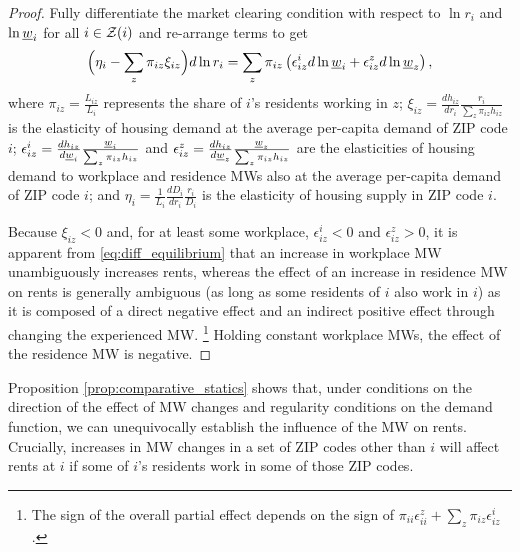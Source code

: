 \begin{proof}
    Fully differentiate the market clearing condition with respect to $\ln r_i$ and 
    $\ln \underline{w}_i$ for all $i\in\mathcal{Z}(i)$ and re-arrange terms to get
    \begin{equation}\label{eq:diff_equilibrium}
        \Big(\eta_i - \sum_z \pi_{iz} \xi_{iz} \Big) d \ln r_i
        = 
        \sum_z \pi_{iz} \left(\epsilon_{iz}^i d \ln \underline{w}_i 
                            + \epsilon_{iz}^z d \ln \underline{w}_z \right) ,
    \end{equation}
    where 
    $\pi_{iz} = \frac{L_{iz}}{L_i}$ represents the share of $i$'s residents working 
    in $z$;
    $\xi_{iz} = \frac{d h_{iz}}{d r_i} \frac{r_i}{\sum_z \pi_{iz} h_{iz}}$ is the 
    elasticity of housing demand at the average per-capita demand of ZIP code $i$;
    $\epsilon_{iz}^i = \frac{d h_{iz}}{d \underline{w}_i} \frac{\underline{w}_i}{\sum_z \pi_{iz} h_{iz}}$ and 
    $\epsilon_{iz}^z = \frac{d h_{iz}}{d \underline{w}_z} \frac{\underline{w}_z}{\sum_z \pi_{iz} h_{iz}}$ 
    are the elasticities of housing demand to workplace and residence MWs also at 
    the average per-capita demand of ZIP code $i$; and
    $\eta_i = \frac{1}{L_i} \frac{d D_i}{d r_i} \frac{r_i}{D_i}$ is the elasticity 
    of housing supply in ZIP code $i$.

    Because $\xi_{iz} < 0$ and, for at least some workplace, $\epsilon_{iz}^i < 0$ 
    and $\epsilon_{iz}^z > 0$, it is apparent from \eqref{eq:diff_equilibrium} that 
    an increase in workplace MW unambiguously increases rents, whereas the effect 
    of an increase in residence MW on rents is generally ambiguous (as long as some 
    residents of $i$ also work in $i$) as it is composed of a direct negative effect 
    and an indirect positive effect through changing the experienced MW.%
    \footnote{The sign of the overall partial effect depends on the sign of 
    $\pi_{ii} \epsilon_{ii}^z + \sum_z \pi_{iz} \epsilon_{iz}^i$.}
    Holding constant workplace MWs, the effect of the residence MW is negative.
\end{proof}

Proposition \ref{prop:comparative_statics} shows that, under conditions on the 
direction of the effect of MW changes and regularity conditions on the demand 
function, we can unequivocally establish the influence of the MW on rents. 
Crucially, increases in MW changes in a set of ZIP codes other than $i$ will affect 
rents at $i$ if some of $i$'s residents work in some of those ZIP codes.


